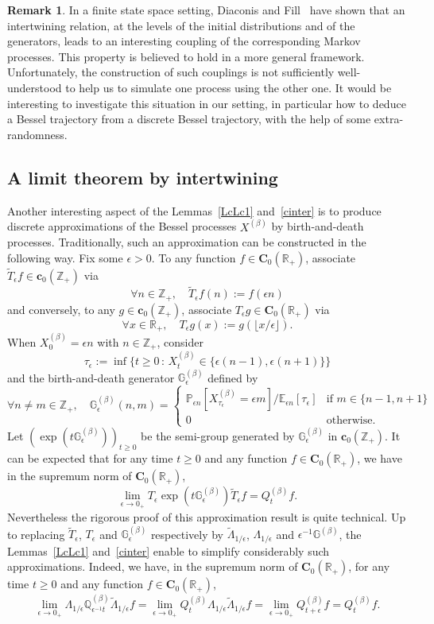 \documentclass[10pt]{amsart}
\theoremstyle{definition}\newtheorem{defi}[theo]{Definition}\newtheorem{rema}[theo]{Remark}\newtheorem{exam}[theo]{Example}\newtheorem{exem}[theo]{Example}\newtheorem{nota}[theo]{Notation}
\newcommand{\df}{\mathrel{:=}}
\newcommand{\EE}{\mathbb{E}}
\newcommand{\PP}{\mathbb{P}}
\newcommand{\RR}{\mathbb{R}}
\newcommand{\ZZ}{\mathbb{Z}}
\newcommand{\ri}{\rightarrow}
\newcommand{\wi}{\widetilde}
\newcommand{\st}{\,:\,}
\newcommand{\dBg}{{\discret{G}}}
\newcommand{\dBs}{{\discret{Q}}}
\newcommand{\Bs}{Q}
\newcommand{\esC}{\mathbf{C}}
\newcommand{\esc}{\mathbf{c}}
\newcommand{\discret}[1]{\mathds{#1}}
\let\oldforall\forall
\renewcommand*{\forall}{\mathrel{\oldforall}}
\begin{document}
\begin{rema}
In a finite state space setting, Diaconis and Fill~\cite{MR1071805} have shown that an intertwining relation, at the levels of the initial distributions and of the generators, leads to an interesting coupling of the corresponding Markov processes. This property is believed to hold in a more general framework. Unfortunately, the construction of such couplings is not sufficiently well-understood to help us to simulate one process using the other one. It would be interesting to investigate this situation in our setting, in particular how to deduce a Bessel trajectory from a discrete Bessel trajectory, with the help of some extra-randomness.
\end{rema}

\subsection{A limit theorem by intertwining}\label{altbi}

Another interesting aspect of the Lemmas~\ref{LcLc1} and~\ref{cinter} is to produce discrete approximations of the Bessel processes $X^{(\beta)}$ by birth-and-death processes. Traditionally, such an approximation can be constructed in the following way. Fix some $\epsilon>0$. To any function $f\in \esC_0(\RR_+)$, associate $\wi T_\epsilon f\in \esc_0(\ZZ_+)$ via
\[
\forall n\in\ZZ_+,\quad \wi T_\epsilon f(n)\df f(\epsilon n)
\]
and conversely, to any $g\in \esc_0(\ZZ_+)$, associate $ T_\epsilon g\in \esC_0(\RR_+)$ via
\[
\forall x\in\RR_+,\quad T_\epsilon g(x)\df g(\lfloor x/\epsilon \rfloor).
\]
When $X^{(\beta)}_0=\epsilon n$ with $n\in\ZZ_+$, consider
\[
\tau_\epsilon\df \inf\{t\geq 0\st X^{(\beta)}_t\in\{\epsilon(n-1),\epsilon(n+1)\}\}
\]
and the birth-and-death generator $\dBg_\epsilon^{(\beta)}$ defined by
\[
\forall n\not= m\in\ZZ_+,\quad
\dBg_\epsilon^{(\beta)}(n,m)=
\begin{cases}
\PP_{\epsilon n}[X_{\tau_\epsilon}^{(\beta)}=\epsilon m]/\EE_{\epsilon n}[\tau_\epsilon]&\text{if $m\in\{n-1,n+1\}$}\\
0&\text{otherwise.}
\end{cases}
\]
Let $(\exp(t\dBg_\epsilon^{(\beta)}))_{t\geq 0}$ be the semi-group generated by $\dBg_\epsilon^{(\beta)}$ in $ \esc_0(\ZZ_+)$. It can be expected that for any time $t\geq 0$ and any function $f\in \esC_0(\RR_+)$, we have in the supremum norm of $\esC_0(\RR_+)$,
\[
\lim_{\epsilon\ri 0_+} T_\epsilon \exp(t\dBg_\epsilon^{(\beta)}) \wi T_\epsilon f=
\Bs^{(\beta)}_t f.
\]
Nevertheless the rigorous proof of this approximation result is quite technical. Up to replacing $\wi T_\epsilon$, $ T_\epsilon$ and $\dBg_\epsilon^{(\beta)}$ respectively by $\wi\Lambda_{1/\epsilon}$, $\Lambda_{1/\epsilon}$ and $\epsilon^{-1}\dBg^{(\beta)}$, the Lemmas~\ref{LcLc1} and~\ref{cinter} enable to simplify considerably such approximations. Indeed, we have, in the supremum norm of $\esC_0(\RR_+)$, for any time $t\geq 0$ and any function $f\in \esC_0(\RR_+)$,
\[
\lim_{\epsilon\ri 0_+}
\Lambda_{1/\epsilon} \dBs_{\epsilon^{-1}t}^{(\beta)} \wi\Lambda_{1/\epsilon} f=
\lim_{\epsilon\ri 0_+}
\Bs^{(\beta)}_t \Lambda_{1/\epsilon}\wi\Lambda_{1/\epsilon}f=\lim_{\epsilon\ri 0_+}
\Bs^{(\beta)}_{t+\epsilon}f=
\Bs^{(\beta)}_t f.
\]
\end{document}
